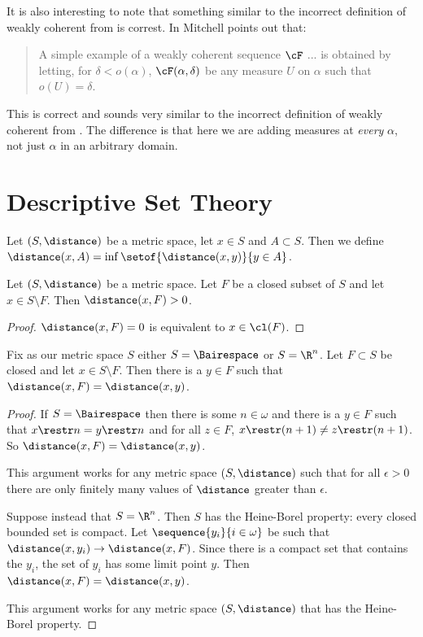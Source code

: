 \documentclass[oneside,12pt]{amsart}
\begin{document}
It is also interesting to note that something similar to the incorrect definition of weakly coherent
from \cite{BeginningInnerModelTheory} is correst. In \cite{Mitchell-Revisited} Mitchell points out
that:

\begin{quote}
A simple example of a weakly coherent sequence $\cF$ ... is obtained by letting, for $\delta<o(\alpha)$,
$\cF(\alpha,\delta)$ be any measure $U$ on $\alpha$ such that $o(U) = \delta$.
\end{quote}

This is correct and sounds very similar to the incorrect definition of weakly coherent from
\cite{BeginningInnerModelTheory}. The difference is that here we are adding measures at \emph{every}
$\alpha$, not just $\alpha$ in an arbitrary domain.



\section{Descriptive Set Theory}

\begin{definition}
Let $(S,\distance)$ be a metric space, let $x\in S$ and $A\subset S$.
Then we define $\distance(x,A) = \inf\setof{\distance(x,y)}{y\in A}$.
\end{definition}

\begin{lemma}
Let $(S,\distance)$ be a metric space. Let $F$ be a closed subset of $S$ and let $x\in S\setminus F$.
Then $\distance(x,F) > 0$.
\end{lemma}
\begin{proof}
$\distance(x,F) = 0$ is equivalent to $x\in\cl(F)$.
\end{proof}

\begin{lemma}
Fix as our metric space $S$ either $S = \Bairespace$ or $S = \R^n$. Let $F\subset S$ be closed and let $x\in S\setminus F$.
Then there is a $y\in F$ such that $\distance(x,F) = \distance(x,y)$.
\end{lemma}
\begin{proof}
If $S=\Bairespace$ then there is some $n\in\omega$ and there is a $y\in F$ such that $x\restr n = y\restr n$ and for all $z\in F$,
$x\restr(n+1) \not= z\restr(n+1)$. So $\distance(x,F) = \distance(x,y)$.

This argument works for any metric space $(S,\distance)$ such that for all $\epsilon>0$ there are only finitely many
values of $\distance$ greater than $\epsilon$.

Suppose instead that $S=\R^n$. Then $S$ has the Heine-Borel property: every closed bounded set is compact.
Let $\sequence{y_i}{i\in\omega}$ be such that $\distance(x, y_i) \to \distance(x, F)$. Since there is a compact set that contains
the $y_i$, the set of $y_i$ has some limit point $y$.  Then $\distance(x,F) = \distance(x,y)$.

This argument works for any metric space $(S,\distance)$ that has the Heine-Borel property.
\end{proof}
\end{document}
